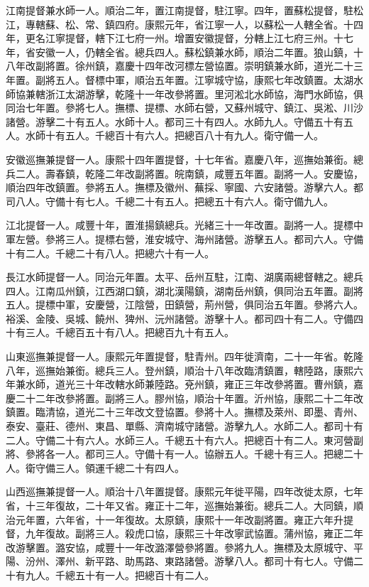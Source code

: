\begin{pinyinscope}
江南提督兼水師一人。順治二年，置江南提督，駐江寧。四年，置蘇松提督，駐松江，專轄蘇、松、常、鎮四府。康熙元年，省江寧一人，以蘇松一人轄全省。十四年，更名江寧提督，轄下江七府一州。增置安徽提督，分轄上江七府三州。十七年，省安徽一人，仍轄全省。總兵四人。蘇松鎮兼水師，順治二年置。狼山鎮，十八年改副將置。徐州鎮，嘉慶十四年改河標左營協置。崇明鎮兼水師，道光二十三年置。副將五人。督標中軍，順治五年置。江寧城守協，康熙七年改鎮置。太湖水師協兼轄浙江太湖游擊，乾隆十一年改參將置。里河淞北水師協，海門水師協，俱同治七年置。參將七人。撫標、提標、水師右營，又蘇州城守、鎮江、吳淞、川沙諸營。游擊二十有五人。水師十人。都司三十有四人。水師九人。守備五十有五人。水師十有五人。千總百十有六人。把總百八十有九人。衛守備一人。

安徽巡撫兼提督一人。康熙十四年置提督，十七年省。嘉慶八年，巡撫始兼銜。總兵二人。壽春鎮，乾隆二年改副將置。皖南鎮，咸豐五年置。副將一人。安慶協，順治四年改鎮置。參將五人。撫標及徽州、蕪採、寧國、六安諸營。游擊六人。都司八人。守備十有七人。千總二十有五人。把總五十有六人。衛守備九人。

江北提督一人。咸豐十年，置淮揚鎮總兵。光緒三十一年改置。副將一人。提標中軍左營。參將三人。提標右營，淮安城守、海州諸營。游擊五人。都司六人。守備十有二人。千總二十有八人。把總六十有一人。

長江水師提督一人。同治元年置。太平、岳州互駐，江南、湖廣兩總督轄之。總兵四人。江南瓜州鎮，江西湖口鎮，湖北漢陽鎮，湖南岳州鎮，俱同治五年置。副將五人。提標中軍，安慶營，江陰營，田鎮營，荊州營，俱同治五年置。參將六人。裕溪、金陵、吳城、饒州、猈州、沅州諸營。游擊十人。都司四十有二人。守備四十有三人。千總百五十有八人。把總百九十有五人。

山東巡撫兼提督一人。康熙元年置提督，駐青州。四年徙濟南，二十一年省。乾隆八年，巡撫始兼銜。總兵三人。登州鎮，順治十八年改臨清鎮置，轄陸路，康熙六年兼水師，道光三十年改轄水師兼陸路。兗州鎮，雍正三年改參將置。曹州鎮，嘉慶二十二年改參將置。副將三人。膠州協，順治十年置。沂州協，康熙二十二年改鎮置。臨清協，道光二十三年改文登協置。參將十人。撫標及萊州、即墨、青州、泰安、臺莊、德州、東昌、單縣、濟南城守諸營。游擊九人。水師二人。都司十有二人。守備二十有六人。水師三人。千總五十有六人。把總百十有二人。東河營副將、參將各一人。都司三人。守備十有一人。協辦五人。千總十有三人。把總二十人。衛守備三人。領運千總二十有四人。

山西巡撫兼提督一人。順治十八年置提督。康熙元年徙平陽，四年改徙太原，七年省，十三年復故，二十年又省。雍正十二年，巡撫始兼銜。總兵二人。大同鎮，順治元年置，六年省，十一年復故。太原鎮，康熙十一年改副將置。雍正六年升提督，九年復故。副將三人。殺虎口協，康熙三十年改寧武協置。蒲州協，雍正二年改游擊置。潞安協，咸豐十一年改潞澤營參將置。參將九人。撫標及太原城守、平陽、汾州、澤州、新平路、助馬路、東路諸營。游擊八人。都司十有七人。守備二十有九人。千總五十有一人。把總百十有二人。


\end{pinyinscope}
